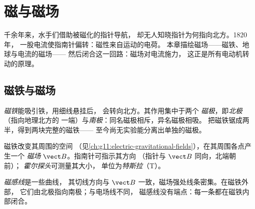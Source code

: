 \chapter{磁与磁场}\label{ch:g11:magnetic-fields}

千余年来，水手们借助被磁化的指针导航，
却无人知晓指针为何指向北方。1820 年，
一股电流使指南针偏转：磁性来自运动的电荷。
本章描绘磁场——磁铁、地球与电流的磁场——
然后闭合这一回路：磁场对电流施力，
这正是所有电动机转动的原理。

\section{磁铁与磁场}

\begin{definition}[磁铁与磁极]\label{def:g11:magnetic-fields:magnet}
\emph{磁铁}能吸引铁，用细线悬挂后，
会转向北方。其作用集中于两个
\emph{磁极}，即\emph{北极}（指向地理北方的
一端）与\emph{南极}：同名磁极相斥，异名磁极相吸。
把磁铁锯成两半，得到两块完整的磁铁——
至今尚无实验能分离出单独的磁极。
\end{definition}

\begin{definition}[磁场]\label{def:g11:magnetic-fields:bfield}
磁铁改变其周围的空间
（见\cref{ch:g11:electric-gravitational-fields}），在其周围各点产生一个
\emph{磁场} $\vect B$。指南针可指示其方向
（指针与 $\vect B$ 同向，北端朝前）；
\emph{霍尔探头}可测量其大小，
单位为\emph{特斯拉}（\unit{T}）。
\end{definition}

\begin{definition}[磁感线]\label{def:g11:magnetic-fields:lines}
\emph{磁感线}是一些曲线，
其切线方向与 $\vect B$ 一致，磁场强处线条密集。在磁铁外部，
它们由北极指向南极；与电场线不同，
磁感线没有端点：每一条都在磁铁内部闭合。
\end{definition}

